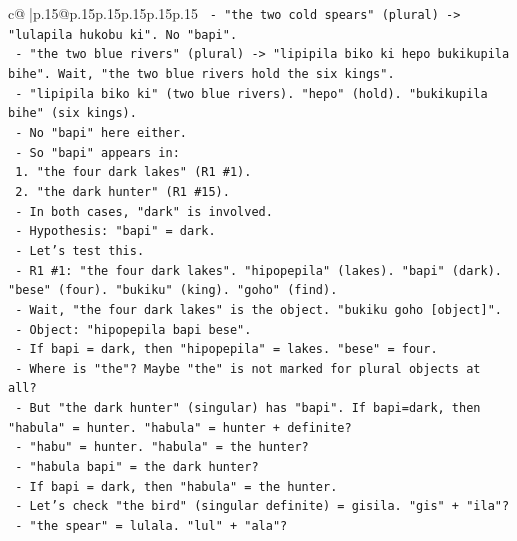 \documentclass{article}
\begin{document}
{\begin{supertabular}{c@{$\;$}|p{.15\linewidth}@{}p{.15\linewidth}p{.15\linewidth}p{.15\linewidth}p{.15\linewidth}p{.15\linewidth}}
{{{\texttt{                {-} "the two cold spears" (plural) {-}> "lulapila hukobu ki". No "bapi".} \\
\texttt{                {-} "the two blue rivers" (plural) {-}> "lipipila biko ki hepo bukikupila bihe". Wait, "the two blue rivers hold the six kings".} \\
\texttt{                  {-} "lipipila biko ki" (two blue rivers). "hepo" (hold). "bukikupila bihe" (six kings).} \\
\texttt{                  {-} No "bapi" here either.} \\
\texttt{                {-} So "bapi" appears in:} \\
\texttt{                  1. "the four dark lakes" (R1 \#1).} \\
\texttt{                  2. "the dark hunter" (R1 \#15).} \\
\texttt{                {-} In both cases, "dark" is involved.} \\
\texttt{                {-} Hypothesis: "bapi" = dark.} \\
\texttt{                {-} Let's test this.} \\
\texttt{                {-} R1 \#1: "the four dark lakes". "hipopepila" (lakes). "bapi" (dark). "bese" (four). "bukiku" (king). "goho" (find).} \\
\texttt{                  {-} Wait, "the four dark lakes" is the object. "bukiku goho {[}object{]}".} \\
\texttt{                  {-} Object: "hipopepila bapi bese".} \\
\texttt{                  {-} If bapi = dark, then "hipopepila" = lakes. "bese" = four.} \\
\texttt{                  {-} Where is "the"? Maybe "the" is not marked for plural objects at all?} \\
\texttt{                  {-} But "the dark hunter" (singular) has "bapi". If bapi=dark, then "habula" = hunter. "habula" = hunter + definite?} \\
\texttt{                  {-} "habu" = hunter. "habula" = the hunter?} \\
\texttt{                  {-} "habula bapi" = the dark hunter?} \\
\texttt{                  {-} If bapi = dark, then "habula" = the hunter.} \\
\texttt{                  {-} Let's check "the bird" (singular definite) = gisila. "gis" + "ila"?} \\
\texttt{                  {-} "the spear" = lulala. "lul" + "ala"?} \\
}}}
\end{supertabular}}
\end{document}
